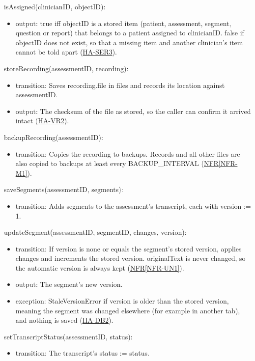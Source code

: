 \documentclass[12pt, titlepage]{article}
\newcommand{\srsref}[2]{\href{https://github.com/Nour-Fawaz/MacaBoca/blob/main/pdfs/SRS/SRS.pdf}{#1\ref*{#2}}}
\newcommand{\hazref}[1]{\href{https://github.com/Nour-Fawaz/MacaBoca/blob/main/pdfs/HazardAnalysis/HazardAnalysis.pdf}{#1}}
\begin{document}
\noindent isAssigned(clinicianID, objectID):
\begin{itemize}
\item output: true iff objectID is a stored item (patient, assessment, segment, question or report) that belongs to a patient assigned to clinicianID. false if objectID does not exist, so that a missing item and another clinician's item cannot be told apart (\hazref{HA-SER3}).
\end{itemize}

\noindent storeRecording(assessmentID, recording):
\begin{itemize}
\item transition: Saves recording.file in files and records its location against assessmentID.
\item output: The checksum of the file as stored, so the caller can confirm it arrived intact (\hazref{HA-VR2}).
\end{itemize}

\noindent backupRecording(assessmentID):
\begin{itemize}
\item transition: Copies the recording to backups. Records and all other files are also copied to backups at least every BACKUP\_INTERVAL (\srsref{NFR}{NFR-M1}).
\end{itemize}

\noindent saveSegments(assessmentID, segments):
\begin{itemize}
\item transition: Adds segments to the assessment's transcript, each with version := 1.
\end{itemize}

\noindent updateSegment(assessmentID, segmentID, changes, version):
\begin{itemize}
\item transition: If version is none or equals the segment's stored version, applies changes and increments the stored version. originalText is never changed, so the automatic version is always kept (\srsref{NFR}{NFR-UN1}).
\item output: The segment's new version.
\item exception: StaleVersionError if version is older than the stored version, meaning the segment was changed elsewhere (for example in another tab), and nothing is saved (\hazref{HA-DB2}).
\end{itemize}

\noindent setTranscriptStatus(assessmentID, status):
\begin{itemize}
\item transition: The transcript's status := status.
\end{itemize}
\end{document}

